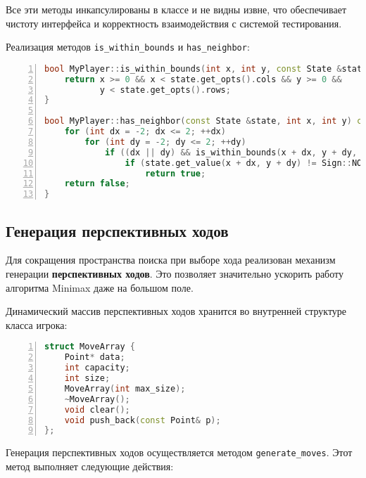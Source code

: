 \noindent Все эти методы инкапсулированы в классе и не видны извне, что обеспечивает чистоту интерфейса и корректность взаимодействия с системой тестирования.  

\vspace{0.5em}

\noindent Реализация методов \verb|is_within_bounds| и \verb|has_neighbor|:

\begin{lstlisting}[language=C++,numbers=left,caption={Вспомогательные методы класса игрока},label={lst:helper_methods}]
bool MyPlayer::is_within_bounds(int x, int y, const State &state) const {
    return x >= 0 && x < state.get_opts().cols && y >= 0 &&
           y < state.get_opts().rows;
}

bool MyPlayer::has_neighbor(const State &state, int x, int y) const {
    for (int dx = -2; dx <= 2; ++dx)
        for (int dy = -2; dy <= 2; ++dy)
            if ((dx || dy) && is_within_bounds(x + dx, y + dy, state))
                if (state.get_value(x + dx, y + dy) != Sign::NONE)
                    return true;
    return false;
}
\end{lstlisting}

\subsection{Генерация перспективных ходов}

Для сокращения пространства поиска при выборе хода реализован механизм генерации \textbf{перспективных ходов}. Это позволяет значительно ускорить работу алгоритма Minimax даже на большом поле.

\vspace{1ex}

Динамический массив перспективных ходов хранится во внутренней структуре класса игрока:

\begin{lstlisting}[language=C++,caption={Фрагмент класса MyPlayer: структура MoveArray},label={lst:move_array},numbers=left]
struct MoveArray {
    Point* data;
    int capacity;
    int size;
    MoveArray(int max_size);
    ~MoveArray();
    void clear();
    void push_back(const Point& p);
};
\end{lstlisting}

\vspace{1ex}

Генерация перспективных ходов осуществляется методом \texttt{generate\_moves}. Этот метод выполняет следующие действия:

